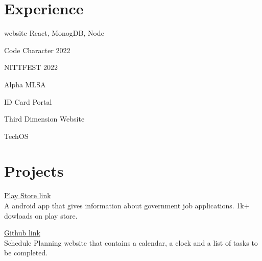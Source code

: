 \documentclass[]{deedy-resume-openfont}
\begin{document}
\begin{minipage}[t]{0.66\textwidth} 

%
%
\section{Experience}
\hfill {}
\begin{tightemize}
	\item  website React, MonogDB, Node
	\item Code Character 2022
	\item NITTFEST 2022
\end{tightemize}
\sectionsep
{}\hfill {}
\begin{tightemize}
	\item Alpha MLSA
\end{tightemize}
\sectionsep
{}\hfill {}
\begin{tightemize}
	\item ID Card Portal
	\item Third Dimension Website
	\item TechOS
\end{tightemize}
\sectionsep
%
%
\section{Projects}
\raggedright

\hfill \href{https://play.google.com/store/apps/details?id=com.amostrone.akash.sanjeevwebsolutions}{Play Store link}\\
A android app that gives information about government job applications. 1k+ dowloads on play store.\\
\sectionsep
  

\hfill \href{https://github.com/jaiakash/PlanitRight}{Github link}\\
Schedule Planning website that contains a calendar, a clock and a list of tasks to be completed.\\
\sectionsep
  


\end{minipage}
\end{document}
